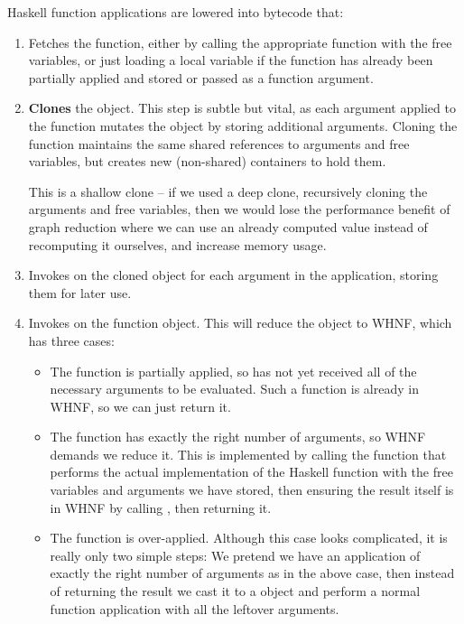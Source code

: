 \documentclass[dissertation.tex]{subfiles}
\begin{document}
{{{            Haskell function applications are lowered into bytecode that:
            \begin{enumerate}
            \item
            {
                Fetches the function, either by calling the appropriate  function with the free variables, or just loading a local variable if the function has already been partially applied and stored or passed as a function argument.
            }
            \item
            {
                \textbf{Clones} the  object. This step is subtle but vital, as each argument applied to the function mutates the  object by storing additional arguments. Cloning the function maintains the same shared references to arguments and free variables, but creates new (non-shared) containers to hold them.
                
                This is a shallow clone -- if we used a deep clone, recursively cloning the arguments and free variables, then we would lose the performance benefit of graph reduction where we can use an already computed value instead of recomputing it ourselves, and increase memory usage. 
            }
            \item
            {
                Invokes  on the cloned object for each argument in the application, storing them for later use.
            }
            \item
            {
                Invokes  on the function object. This will reduce the object to WHNF, which has three cases:

                \begin{itemize}
                \item
                {
                    The function is partially applied, so has not yet received all of the necessary arguments to be evaluated. Such a function is already in WHNF, so we can just return it.
                }
                \item
                {
                    The function has exactly the right number of arguments, so WHNF demands we reduce it. This is implemented by calling the  function that performs the actual implementation of the Haskell function with the free variables and arguments we have stored, then ensuring the result itself is in WHNF by calling , then returning it.
                }
                \item
                {
                    The function is over-applied. Although this case looks complicated, it is really only two simple steps: We pretend we have an application of exactly the right number of arguments as in the above case, then instead of returning the result we cast it to a  object and perform a normal function application with all the leftover arguments.
                }
                \end{itemize}
            }
            \end{enumerate}

}}}
\end{document}
